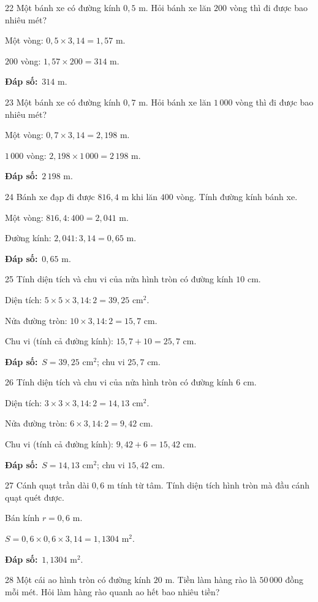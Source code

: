 \documentclass[11pt]{article}
\newif\ifsol \solfalse
\providecommand{\AnsWord}{Đáp số}
\newcommand{\dapso}[1]{\par\textbf{\AnsWord:}\ #1}
\newcommand{\probsol}[1]{%
  \begin{lrbox}{\solmeasure}\begin{minipage}{\dimexpr\linewidth-24pt\relax}#1\end{minipage}\end{lrbox}%
  \ifsol
    \begin{solbox}#1\end{solbox}%
  \else
    \setlength{\solht}{\dimexpr\ht\solmeasure+\dp\solmeasure+0.85cm\relax}%
    \ifdim\solht<1.35cm\setlength{\solht}{1.35cm}\fi
    \begin{tcolorbox}[colback=white,colframe=Line,boxrule=0.8pt,arc=5pt,
      left=8pt,right=8pt,top=4pt,bottom=4pt,height=\solht]{\footnotesize\color{Slate}\itshape\WorkWord}\end{tcolorbox}%
  \fi}
\newcommand{\gap}{\vspace{0.3cm}}
\def\WorkWord{Bài làm:}
\def\AnsWord{Đáp số}
\begin{document}
\gap
\begin{probbox}{22}{\relax}
Một bánh xe có đường kính $0{,}5$ m. Hỏi bánh xe lăn $200$ vòng thì đi được bao nhiêu mét?
\end{probbox}
\probsol{
Một vòng: $0{,}5\times3{,}14=1{,}57$ m.\par $200$ vòng: $1{,}57\times200=314$ m.
\dapso{$314$ m.}}
\gap
\begin{probbox}{23}{\relax}
Một bánh xe có đường kính $0{,}7$ m. Hỏi bánh xe lăn $1\,000$ vòng thì đi được bao nhiêu mét?
\end{probbox}
\probsol{
Một vòng: $0{,}7\times3{,}14=2{,}198$ m.\par $1\,000$ vòng: $2{,}198\times1\,000=2\,198$ m.
\dapso{$2\,198$ m.}}
\gap
\begin{probbox}{24}{\relax}
Bánh xe đạp đi được $816{,}4$ m khi lăn $400$ vòng. Tính đường kính bánh xe.
\end{probbox}
\probsol{
Một vòng: $816{,}4:400=2{,}041$ m.\par Đường kính: $2{,}041:3{,}14=0{,}65$ m.
\dapso{$0{,}65$ m.}}
\gap
\begin{probbox}{25}{\relax}
Tính diện tích và chu vi của nửa hình tròn có đường kính $10$ cm.
\end{probbox}
\probsol{
Diện tích: $5\times5\times3{,}14:2=39{,}25$ cm$^2$.\par Nửa đường tròn: $10\times3{,}14:2=15{,}7$ cm.\par Chu vi (tính cả đường kính): $15{,}7+10=25{,}7$ cm.
\dapso{$S=39{,}25$ cm$^2$; chu vi $25{,}7$ cm.}}
\gap
\begin{probbox}{26}{\relax}
Tính diện tích và chu vi của nửa hình tròn có đường kính $6$ cm.
\end{probbox}
\probsol{
Diện tích: $3\times3\times3{,}14:2=14{,}13$ cm$^2$.\par Nửa đường tròn: $6\times3{,}14:2=9{,}42$ cm.\par Chu vi (tính cả đường kính): $9{,}42+6=15{,}42$ cm.
\dapso{$S=14{,}13$ cm$^2$; chu vi $15{,}42$ cm.}}
\gap
\begin{probbox}{27}{\relax}
Cánh quạt trần dài $0{,}6$ m tính từ tâm. Tính diện tích hình tròn mà đầu cánh quạt quét được.
\end{probbox}
\probsol{
Bán kính $r=0{,}6$ m.\par $S=0{,}6\times0{,}6\times3{,}14=1{,}1304$ m$^2$.
\dapso{$1{,}1304$ m$^2$.}}
\gap
\begin{probbox}{28}{\relax}
Một cái ao hình tròn có đường kính $20$ m. Tiền làm hàng rào là $50\,000$ đồng mỗi mét. Hỏi làm hàng rào quanh ao hết bao nhiêu tiền?
\end{probbox}
\end{document}
